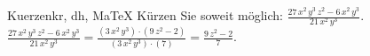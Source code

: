 \begin{MAufgabe}{Kuerzen}{kr, dh, MaTeX}
K\"urzen Sie soweit m\"oglich: $\frac{27\, x^2\, y^3\, z^2 - 6\, x^2\, y^3}{21\, x^2\, y^3}$.\\ 
\ifLsg\MLoesung
\quad $\frac{27\, x^2\, y^3\, z^2 - 6\, x^2\, y^3}{21\, x^2\, y^3}=\frac{(3\, x^2\, y^3)\cdot(9\, z^2 - 2)}{(3\, x^2\, y^3)\cdot(7)}=\frac{9\, z^2 - 2}{7}$.\else\relax\fi
 \end{MAufgabe}